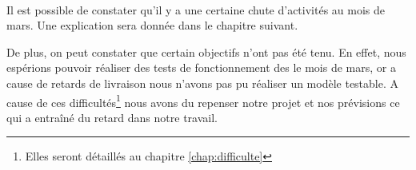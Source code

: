 ~\\
Il est possible de constater qu'il y a une certaine chute d'activités au mois de mars. Une explication sera donnée dans le chapitre suivant.

De plus, on peut constater que certain objectifs n'ont pas été tenu. En effet, nous espérions pouvoir réaliser des tests de fonctionnement des le mois de mars, or a cause de retards de livraison nous n'avons pas pu réaliser un modèle testable. A cause de ces difficultés\footnote{Elles seront détaillés au chapitre \ref{chap:difficulte}} nous avons du repenser notre projet et nos prévisions ce qui a entraîné du retard dans notre travail.


